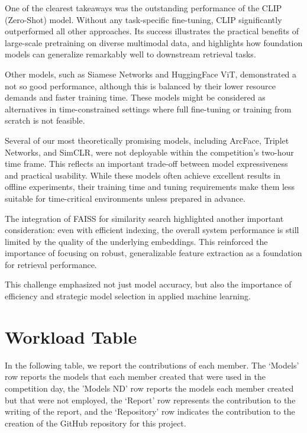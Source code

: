 \documentclass[10pt,twocolumn,letterpaper]{article}
\begin{document}
One of the clearest takeaways was the outstanding performance of the CLIP (Zero-Shot) model. Without any task-specific fine-tuning, CLIP significantly outperformed all other approaches. Its success illustrates the practical benefits of large-scale pretraining on diverse multimodal data, and highlights how foundation models can generalize remarkably well to downstream retrieval tasks.

Other models, such as Siamese Networks and HuggingFace ViT, demonstrated a not so good performance, although this is balanced by their lower resource demands and faster training time. These models might be considered as alternatives in time-constrained settings where full fine-tuning or training from scratch is not feasible.

Several of our most theoretically promising models, including ArcFace, Triplet Networks, and SimCLR, were not deployable within the competition's two-hour time frame. This reflects an important trade-off between model expressiveness and practical usability. While these models often achieve excellent results in offline experiments, their training time and tuning requirements make them less suitable for time-critical environments unless prepared in advance.

The integration of FAISS for similarity search highlighted another important consideration: even with efficient indexing, the overall system performance is still limited by the quality of the underlying embeddings. This reinforced the importance of focusing on robust, generalizable feature extraction as a foundation for retrieval performance.

This challenge emphasized not just model accuracy, but also the importance of efficiency and strategic model selection in applied machine learning.

\section{Workload Table}
In the following table, we report the contributions of each member. The ‘Models’ row reports the models that each member created that were used in the competition day, the 'Models ND' row reports the models each member created but that were not employed, the ‘Report’ row represents the contribution to the writing of the report, and the ‘Repository’ row indicates the contribution to the creation of the GitHub repository for this project.
\end{document}
